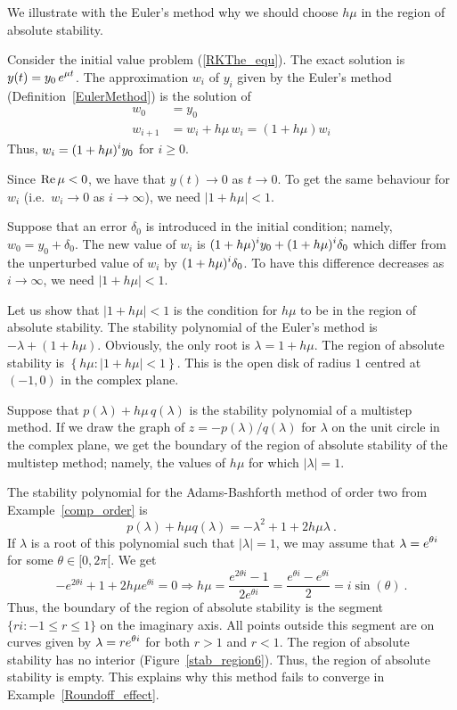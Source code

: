 \begin{egg}
We illustrate with the Euler's method why we should choose $h\mu$ in
the region of absolute stability.

Consider the initial value problem (\ref{RKThe_equ}).  The exact
solution is $\displaystyle y(t) = y_0\,e^{\mu t}$.  The approximation $w_i$ of
$y_i$ given by the Euler's method (Definition~\ref{EulerMethod}) is
the solution of
\begin{align*}
w_0 &= y_0 \\
w_{i+1} &= w_i + h\mu\, w_i = (1+h\mu)w_i
\end{align*}
Thus, $\displaystyle w_i = (1+h\mu)^iy_0$ for $i\geq 0$.

Since $\operatorname{Re} \mu<0$, we have that $y(t) \rightarrow 0$ as $t \rightarrow 0$.
To get the same behaviour for $w_i$
(i.e.\ $w_i \rightarrow 0$ as $i \rightarrow \infty$), we
need  $|1+h\mu| < 1$.

Suppose that an error $\delta_0$ is introduced in the initial
condition; namely, $w_0 = y_0 + \delta_0$.  The new value of $w_i$ is
$\displaystyle (1+h\mu)^i y_0 + (1+h\mu)^i \delta_0$ which differ from the
unperturbed value of $w_i$ by $\displaystyle (1+h\mu)^i \delta_0$.  To have this
difference decreases as $i \rightarrow \infty$, we need
$|1+h\mu| < 1$.

Let us show that $|1+h\mu| < 1$ is the condition for $h\mu$ to be in the
region of absolute stability.  The stability polynomial of the Euler's
method is $-\lambda + (1+h\mu)$.
Obviously, the only root is $\lambda = 1 + h\mu$.  The region of
absolute stability is
$\left\{ h\mu : |1 + h\mu| < 1 \right\}$.  This is the open disk of
radius $1$ centred at $(-1,0)$ in the complex plane.
\end{egg}

\begin{rmk}
Suppose that $p(\lambda) + h\mu\, q(\lambda)$ is the stability
polynomial of a multistep method.  If we draw the graph of
$z = - p(\lambda)/q(\lambda)$ for $\lambda$ on the unit circle in the
complex plane, we get the boundary of the region of absolute stability
of the multistep method; namely, the values of $h\mu$ for which
$|\lambda|=1$.
\end{rmk}

\begin{egg}
The stability polynomial for the Adams-Bashforth method of order two
from Example~\ref{comp_order} is
\[
  p(\lambda) + h\mu q(\lambda) = -\lambda^2 + 1 + 2h\mu \lambda \ .
\]
If $\lambda$ is a root of this polynomial such that $|\lambda| = 1$,
we may assume that $\displaystyle \lambda = e^{\theta i}$ for some
$\theta \in [0,2\pi[$.  We get
\[
-e^{2\theta i} + 1 + 2h\mu e^{\theta i} = 0
\Rightarrow h \mu = \frac{e^{2\theta i} -1}{2e^{\theta i}}
= \frac{e^{\theta i} -e^{\theta i}}{2} = i\sin(\theta) \ .
\]
Thus, the boundary of the region of absolute stability is the segment
$\{ r i : -1 \leq r \leq 1\}$ on the imaginary axis.  All points
outside this segment are on curves given by
$\displaystyle \lambda = r e^{\theta i}$
for both $r>1$ and $r<1$.  The region of absolute stability has no
interior (Figure~\ref{stab_region6}).  Thus, the region 
of absolute stability is empty.  This explains why this method
fails to converge in Example~\ref{Roundoff_effect}.
\end{egg}

